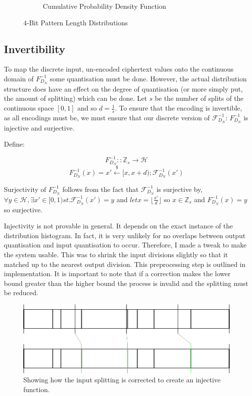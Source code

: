 \documentclass[10pt,a4paper]{article}
\begin{document}
\begin{figure}[h]
\begin{subfigure}[b]{.49\linewidth}
\begin{tikzpicture}
\end{tikzpicture}
\caption{Cumulative Probability Density Function}
\label{fig:cum_dist_pat4}
\end{subfigure}
\caption{4-Bit Pattern Length Distributions}
\label{fig:cum_conv}
\end{figure}



\subsection{Invertibility}

To map the discrete input, un-encoded ciphertext values onto the continuous domain of $F^{-1}_{D_N}$ some quantisation must be done.
However, the actual distribution structure does have an effect on the degree of quantisation (or more simply put, the amount of splitting) which can be done.
Let $s$ be the number of splits of the continuous space $[0,1]$ and so $d = \frac{1}{s}$.
To ensure that the encoding is invertible, as all encodings must be, we must ensure that our discrete version of $\mathcal{F}^{-1}_{D_N}$: $F^{-1}_{D_N}$ is injective and surjective.

Define:

$$F^{-1}_{D_N} :: \mathbb{Z}_s \rightarrow \mathcal{H}$$
$$F^{-1}_{D_N}(x) = x' \xleftarrow{\$} [x, x+d); \mathcal{F}^{-1}_{D_N}(x')$$

Surjectivity of $F^{-1}_{D_N}$ follows from the fact that $\mathcal{F}^{-1}_{D_N}$ is surjective by, $\forall y \in \mathcal{H}, \exists x' \in [0,1) st. \mathcal{F}^{-1}_{D_N}(x') = y$ and $ let x = \lfloor \frac{x'}{d} \rfloor$ so $x \in \mathbb{Z}_s$ and $F^{-1}_{D_N}(x) = y$ so surjective.

Injectivity is not provable in general. It depends on the exact instance of the distribution histogram.
In fact, it is very unlikely for no overlaps between output quantisation and input quantisation to occur.
Therefore, I made a tweak to make the system usable. This was to shrink the input divisions slightly so that it matched up to the nearest output division.
This preprocessing step is outlined in implementation.
It is important to note that if a correction makes the lower bound greater than the higher bound the process is invalid and the splitting must be reduced.

\begin{figure}[h]
\includegraphics[scale=.8]{correction}
\caption{Showing how the input splitting is corrected to create an injective function.}
\label{correction}
\end{figure}
\end{document}
